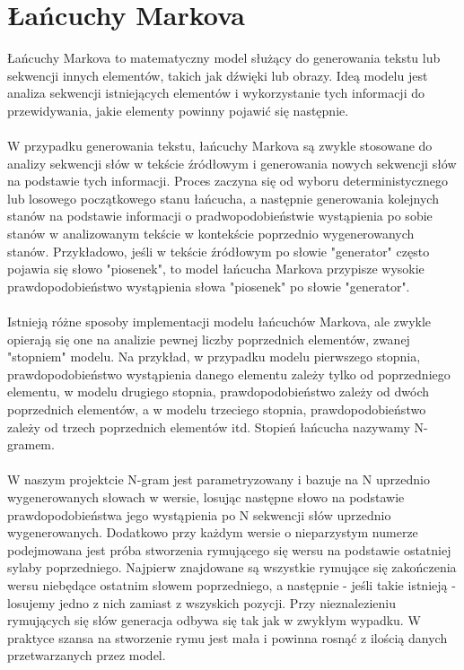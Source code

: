 \documentclass{article}
\begin{document}
\section{Łańcuchy Markova}
Łańcuchy Markova to matematyczny model służący do generowania tekstu lub sekwencji innych elementów, takich jak dźwięki lub obrazy. Ideą modelu jest analiza sekwencji istniejących elementów i wykorzystanie tych informacji do przewidywania, jakie elementy powinny pojawić się następnie. \\
\\
W przypadku generowania tekstu, łańcuchy Markova są zwykle stosowane do analizy sekwencji słów w tekście źródłowym i generowania nowych sekwencji słów na podstawie tych informacji. Proces zaczyna się od wyboru deterministycznego lub losowego początkowego stanu łańcucha, a następnie generowania kolejnych stanów na podstawie informacji o pradwopodobieństwie wystąpienia po sobie stanów w analizowanym tekście w kontekście poprzednio wygenerowanych stanów. Przykładowo, jeśli w tekście źródłowym po słowie "generator" często pojawia się słowo "piosenek", to model łańcucha Markova przypisze wysokie prawdopodobieństwo wystąpienia słowa "piosenek" po słowie "generator". \\
\\
Istnieją różne sposoby implementacji modelu łańcuchów Markova, ale zwykle opierają się one na analizie pewnej liczby poprzednich elementów, zwanej "stopniem" modelu. Na przykład, w przypadku modelu pierwszego stopnia, prawdopodobieństwo wystąpienia danego elementu zależy tylko od poprzedniego elementu, w modelu drugiego stopnia, prawdopodobieństwo zależy od dwóch poprzednich elementów, a w modelu trzeciego stopnia, prawdopodobieństwo zależy od trzech poprzednich elementów itd. Stopień łańcucha nazywamy N-gramem.\\
\\
W naszym projektcie N-gram jest parametryzowany i bazuje na N uprzednio wygenerowanych słowach w wersie, losując następne słowo na podstawie prawdopodobieństwa jego wystąpienia po N sekwencji słów uprzednio wygenerowanych. Dodatkowo przy każdym wersie o nieparzystym numerze podejmowana jest próba stworzenia rymującego się wersu na podstawie ostatniej sylaby poprzedniego. Najpierw znajdowane są wszystkie rymujące się zakończenia wersu niebędące ostatnim słowem poprzedniego, a następnie - jeśli takie istnieją - losujemy jedno z nich zamiast z wszyskich pozycji. Przy nieznalezieniu rymujących się słów generacja odbywa się tak jak w zwykłym wypadku. W praktyce szansa na stworzenie rymu jest mała i powinna rosnąć z ilością danych przetwarzanych przez model.\\
\end{document}
